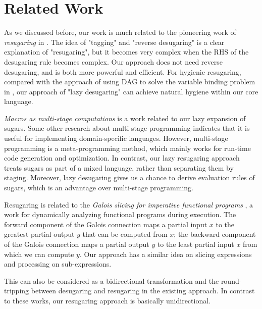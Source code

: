 \section{Related Work}
\label{sec6}

As we discussed before, our work is much related to the pioneering work of \emph{resugaring} in \cite{resugaring}. The idea of "tagging" and "reverse desugaring" is a clear explanation of "resugaring", but it becomes very complex when the RHS of the desugaring rule becomes complex. Our approach does not need reverse desugaring, and is both more powerful and efficient.
For hygienic resugaring, compared with the approach of using DAG to solve the variable binding problem in \cite{hygienic}, our approach of "lazy desugaring" can achieve natural hygiene within our core language.

\emph{Macros as multi-stage computations} \cite{multistage} is a work related to our lazy expansion of sugars. Some other research \cite{modularstaging} about multi-stage programming \cite{MSP} indicates that it is useful for implementing domain-specific languages. However, multi-stage programming is a meta-programming method, which mainly works for run-time code generation and optimization. In contrast, our lazy resugaring approach treats sugars as part of a mixed language, rather than separating them by staging. Moreover, lazy desugaring gives us a chance to derive evaluation rules of sugars, which is an advantage over multi-stage programming.





Resugaring is related to the \emph{Galois slicing for imperative functional programs} \cite{slicing}, a work for dynamically analyzing functional programs during execution. The forward component of the Galois connection maps a partial input $x$ to the greatest partial output $y$ that can be computed from $x$; the backward component of the Galois connection maps a partial output $y$ to the least partial input $x$ from which we can compute $y$.
Our approach has a similar idea on slicing expressions and processing on sub-expressions.

This can also be considered as a bidirectional transformation \cite{bx,lens07} and the round-tripping between desugaring and resugaring in the existing approach. In contrast to these works, our resugaring approach is basically unidirectional. 


